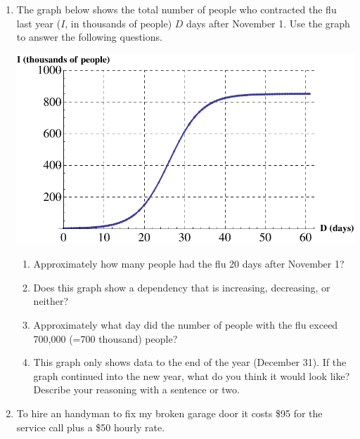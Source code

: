 \documentclass[12pt]{article}
\begin{document}
\hrulefill


\newpage

\begin{enumerate}
\item The graph below shows the total number of people who contracted the flu last year ($I$, in thousands of people) $D$ days after November 1.  Use the graph to answer the following questions.

\begin{center}
 {\includegraphics [width = 8in] {flu}}
\end{center}



\begin{enumerate}
\item Approximately how many people had the flu 20 days after November 1? 
\vfill
\item Does this graph show a dependency that is increasing, decreasing, or neither?
\vfill
\item Approximately what day did the number of people with the flu exceed 700,000 (=700 thousand) people?
\vfill
\item This graph only shows data to the end of the year (December 31).  If the graph continued into the new year, what do you think it would look like?  Describe your reasoning with a sentence or two.
\vfill
\end{enumerate}
\newpage
\item  To hire an handyman to fix my broken garage door it costs \$95 for the service call plus a \$50 hourly rate.


\end{enumerate}
\end{document}
